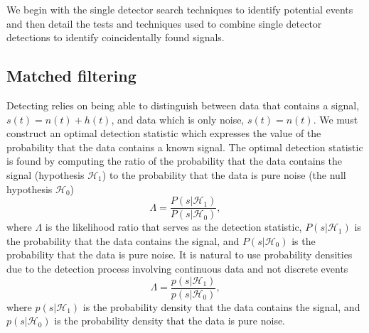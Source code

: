 We begin with the single detector search techniques to identify potential \gwadj events and then detail the tests and techniques used to combine single detector detections to identify coincidentally found \gwadj signals.

\subsection{\label{2:sec:matched-filter}Matched filtering}

Detecting \gws relies on being able to distinguish between data that contains a \gwadj signal, \( s(t) = n(t) + h(t) \), and data which is only noise, \( s(t) = n(t) \). We must construct an optimal detection statistic which expresses the value of the probability that the data contains a known signal. The optimal detection statistic is found by computing the ratio of the probability that the data contains the signal (hypothesis $\mathcal{H}_{1}$) to the probability that the data is pure noise (the null hypothesis $\mathcal{H}_{0}$)
%
\begin{equation}
    \Lambda = \frac{P(s|\mathcal{H}_{1})}{P(s|\mathcal{H}_{0})},
\end{equation}
%
where \( \Lambda \) is the likelihood ratio that serves as the detection statistic, \( P(s|\mathcal{H}_{1}) \) is the probability that the data contains the signal, and \( P(s|\mathcal{H}_{0}) \) is the probability that the data is pure noise. It is natural to use probability densities due to the detection process involving continuous data and not discrete events
%
\begin{equation}
    \Lambda = \frac{p(s|\mathcal{H}_{1})}{p(s|\mathcal{H}_{0})},
    \label{2:eq:likelihood_ratio}
\end{equation}
%
where \( p(s|\mathcal{H}_{1}) \) is the probability density that the data contains the signal, and \( p(s|\mathcal{H}_{0}) \) is the probability density that the data is pure noise.

